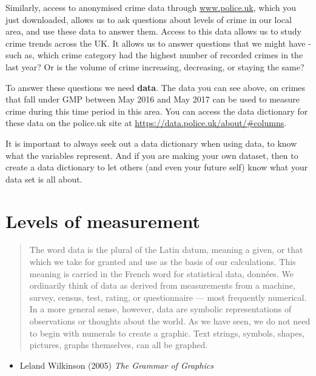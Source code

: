 \documentclass[
]{book}
\providecommand{\tightlist}{%
  \setlength{\itemsep}{0pt}\setlength{\parskip}{0pt}}
\begin{document}
Similarly, access to anonymised crime data through \url{www.police.uk}, which you just downloaded, allows us to ask questions about levels of crime in our local area, and use these data to answer them. Access to this data allows us to study crime trends across the UK. It allows us to answer questions that we might have - such as, which crime category had the highest number of recorded crimes in the last year? Or is the volume of crime increasing, decreasing, or staying the same?

To answer these questions we need \textbf{data}. The data you can see above, on crimes that fall under GMP between May 2016 and May 2017 can be used to measure crime during this time period in this area. You can access the data dictionary for these data on the police.uk site at \url{https://data.police.uk/about/\#columns}.

It is important to always seek out a data dictionary when using data, to know what the variables represent. And if you are making your own dataset, then to create a data dictionary to let others (and even your future self) know what your data set is all about.

\hypertarget{levels-of-measurement}{%
\section{Levels of measurement}\label{levels-of-measurement}}

\begin{quote}
The word data is the plural of the Latin datum, meaning a given, or that which we take for granted and use as the basis of our calculations. This meaning is carried in the French word for statistical data, données. We ordinarily think of data as derived from measurements from a machine, survey, census, test, rating, or questionnaire --- most frequently numerical. In a more general sense, however, data are symbolic representations of observations or thoughts about the world. As we have seen, we do not need to begin with numerals to create a graphic. Text strings, symbols, shapes, pictures, graphs themselves, can all be graphed.
\end{quote}

\begin{itemize}
\tightlist
\item
  Leland Wilkinson (2005) \emph{The Grammar of Graphics}
\end{itemize}
\end{document}
